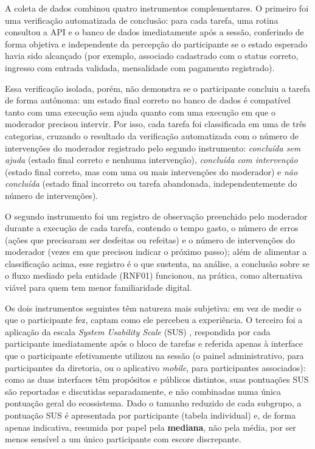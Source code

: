 \documentclass[12pt,a4paper]{article}
\begin{document}
A coleta de dados combinou quatro instrumentos complementares. O primeiro foi uma verificação
automatizada de conclusão: para cada tarefa, uma rotina consultou a API e o banco de dados
imediatamente após a sessão, conferindo de forma objetiva e independente da percepção do
participante se o estado esperado havia sido alcançado (por exemplo, associado cadastrado com o
status correto, ingresso com entrada validada, mensalidade com pagamento registrado).

Essa verificação
isolada, porém, não demonstra se o participante concluiu a tarefa de forma autônoma: um estado final
correto no banco de dados é compatível tanto com uma execução sem ajuda quanto com uma execução em
que o moderador precisou intervir. Por isso, cada tarefa foi classificada em uma de três categorias,
cruzando o resultado da verificação automatizada com o número de intervenções do moderador registrado
pelo segundo instrumento: \textit{concluída sem ajuda} (estado final correto e nenhuma intervenção),
\textit{concluída com intervenção} (estado final correto, mas com uma ou mais intervenções do
moderador) e \textit{não concluída} (estado final incorreto ou tarefa abandonada,
independentemente do número de intervenções).

O segundo instrumento foi um registro de observação
preenchido pelo moderador durante a execução de cada tarefa, contendo o tempo gasto, o número de erros
(ações que precisaram ser desfeitas ou refeitas) e o número de intervenções do moderador (vezes em que
precisou indicar o próximo passo); além de alimentar a classificação acima, esse registro é o que
sustenta, na análise, a conclusão sobre se o fluxo mediado pela entidade (RNF01) funcionou, na
prática, como alternativa viável para quem tem menor familiaridade digital.

Os dois instrumentos seguintes têm natureza mais subjetiva: em vez de medir o que o participante fez,
captam como ele percebeu a experiência. O terceiro foi a aplicação da escala \textit{System Usability
Scale} (SUS) \parencite{brooke1996}, respondida por cada
participante imediatamente após o bloco de tarefas e referida apenas à interface que o participante
efetivamente utilizou na sessão (o painel administrativo, para participantes da diretoria, ou o
aplicativo \textit{mobile}, para participantes associados): como as duas interfaces têm propósitos e
públicos distintos, suas pontuações SUS são reportadas e discutidas separadamente, e não combinadas
numa única pontuação geral do ecossistema. Dado o tamanho reduzido de cada subgrupo, a pontuação SUS
é apresentada por participante (tabela individual) e, de forma apenas indicativa, resumida por papel
pela \textbf{mediana}, não pela média, por ser menos sensível a um único participante com escore
discrepante.
\end{document}
